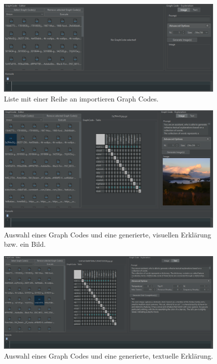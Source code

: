 \begin{landscape}
  \begin{figure}
    \includegraphics[width=\textwidth]{chapter/chapter_4/ui-ex-3}
    \caption{Liste mit einer Reihe an importieren Graph Codes.}
    \label{sec4:impl:subsubsec:summary-findings:fig:ui-ex-3}
  \end{figure}
\end{landscape}

\begin{landscape}
  \begin{figure}
    \includegraphics[width=\textwidth]{chapter/chapter_4/ui-ex-4}
    \caption{Auswahl eines Graph Codes und eine generierte, visuellen Erklärung bzw. ein Bild.}
    \label{sec4:impl:subsubsec:summary-findings:fig:ui-ex-4}
  \end{figure}
\end{landscape}

\begin{landscape}
  \begin{figure}
    \includegraphics[width=\textwidth]{chapter/chapter_4/ui-ex-5}
    \caption{Auswahl eines Graph Codes und eine generierte, textuelle Erklärung.}
    \label{sec4:impl:subsubsec:summary-findings:fig:ui-ex-5}
  \end{figure}
\end{landscape}


